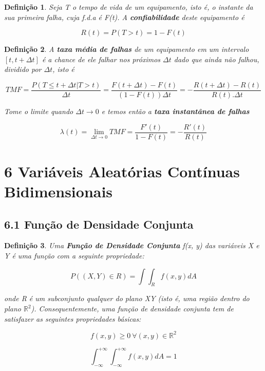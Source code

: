 \documentclass[12pt]{article}
\newtheorem{definition}{Definição}
\begin{document}
\begin{definition}
    Seja T o tempo de vida de um equipamento, isto é, o instante da sua primeira falha, cuja f.d.a é F(t). A \textbf{confiabilidade} deste equipamento é
    
    $$R(t) = P(T > t) = 1 - F(t)$$
\end{definition}

\begin{definition}
    A \textbf{taxa média de falhas} de um equipamento em um intervalo $[t, t + \Delta t]$ é a chance de ele falhar nos próximos $\Delta t$ dado que ainda não falhou, dividido por $\Delta t$, isto é
    
    $$TMF = \dfrac{P(T \leq t + \Delta t | T > t)}{\Delta t} = \dfrac{F(t + \Delta t) - F(t)}{(1 - F(t)) \Delta t} = - \dfrac{R(t + \Delta t) - R(t)}{R(t).\Delta t}$$
    
    Tome o limite quando $\Delta t \rightarrow{} 0$ e temos então a \textbf{taxa instantânea de falhas}
    
    $$\lambda(t) = \lim_{\Delta t \rightarrow{} 0} TMF = \dfrac{F'(t)}{1 - F(t)} = - \dfrac{R'(t)}{R(t)}$$
\end{definition}

\section*{6 Variáveis Aleatórias Contínuas Bidimensionais}
\label{s26}

\subsection*{6.1 Função de Densidade Conjunta}
\label{s27}

\begin{definition}
    Uma \textbf{Função de Densidade Conjunta} f(x, y) das variáveis X e Y é uma função com a seguinte propriedade:
    
    $$P((X, Y) \in R) = \int \int_R f(x, y) d A$$
    
    onde R é um subconjunto qualquer do plano XY (isto é, uma região dentro do plano $\mathbb{R}^2$). Consequentemente, uma função de densidade conjunta tem de satisfazer as seguintes propriedades básicas:
    
    $$f(x, y) \geq 0 \ \forall (x, y) \in \mathbb{R}^2$$
    
    $$\int_{- \infty}^{+ \infty} \int_{- \infty}^{+ \infty} f(x, y) d A = 1$$
\end{definition}
\end{document}
